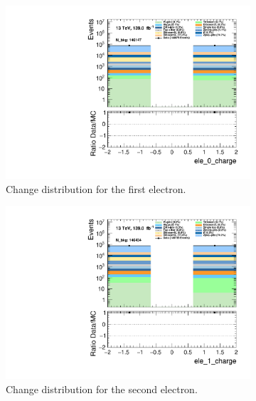 \begin{figure}
    \centering
    \begin{subfigure}{.49\textwidth}
        \includegraphics[width=\textwidth]{Figures/MC_Data_comp/ele_0_charge.pdf}
        \caption{Change distribution for the first electron.}
        \label{fig:ele_0_charge}
    \end{subfigure}
    \hfill
    \begin{subfigure}{.49\textwidth}
        \includegraphics[width=\textwidth]{Figures/MC_Data_comp/ele_1_charge.pdf}
        \caption{Change distribution for the second electron. }
        \label{fig:ele_1_charge}
    \end{subfigure}
    \hfill 
    \begin{subfigure}{.49\textwidth}

\end{subfigure}
\end{figure}
